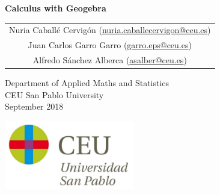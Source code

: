 \begin{titlepage}
\thispagestyle{empty}
\vspace*{7cm}
\par

\begin{center}
\normalfont\fontsize{30}{30}\selectfont
{\bfseries \color{blueceu}Calculus with Geogebra}
\end{center}
\vspace{1cm}

\begin{center}
\Large
\begin{tabular}{c}
Nuria Caballé Cervigón (\url{nuria.caballecervigon@ceu.es})\\
Juan Carlos Garro Garro (\url{garro.eps@ceu.es})\\
Alfredo Sánchez Alberca (\url{asalber@ceu.es})\\
\end{tabular}

\medskip 
Department of Applied Maths and Statistics\\ CEU San Pablo University\\[1cm]
\medskip 
September 2018

\vspace{1cm}
\includegraphics[height=3cm]{img/logo_uspceu}
\end{center}
\vfill
\end{titlepage}